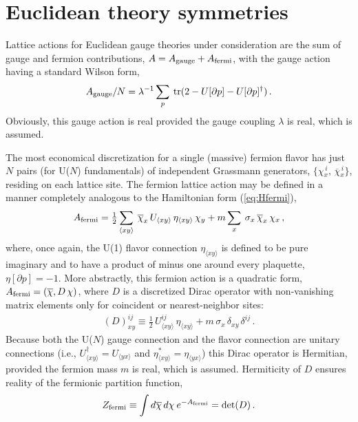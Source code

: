 \documentclass [12pt]{article}
\newcommand{\tr}{\mathop{\mathrm{tr}}}
\begin{document}
\section {Euclidean theory symmetries}\label{sec:Euclidean}

Lattice actions for
Euclidean gauge theories under consideration 
are the sum of gauge and fermion contributions,
$A = A_{\rm gauge} + A_{\rm fermi}$, with the gauge action
having a standard Wilson form,
\begin{align}
    A_{\rm gauge}/N
    =
    \lambda^{-1} \sum_p \> \tr (2 - U[\partial p] - U[\partial p]^\dagger) \,.
\label{eq:Agauge}
\end{align}
Obviously, this gauge action is real provided the gauge coupling $\lambda$ is
real, which is assumed.

The most economical discretization for a single (massive) fermion flavor 
has just $N$ pairs (for U($N$) fundamentals) 
of independent Grassmann generators,
$\{ \chi{}_x^{\,i},\, \overline\chi{}_x^{\,i}\}$,
residing on each lattice site.
The fermion lattice action may be defined in a manner
completely analogous to the Hamiltonian form (\ref{eq:Hfermi}),
\begin{align}
    A_{\rm fermi}
    =
    \tfrac 12 \sum_{\langle xy \rangle} \>
    \overline\chi_x \, U_{\langle xy \rangle} \, \eta_{\langle xy \rangle} \, \chi_y
    + m \sum_x \> \sigma_x \, \overline\chi_x \, \chi_x \,,
\label{eq:Afermiold}
\end{align}
where, once again, the U(1) flavor connection $\eta_{\langle xy\rangle}$ is defined
to be pure imaginary and to have a product of minus one around every plaquette,
$\eta[\partial p] = -1$.
More abstractly, this fermion action is a quadratic form,
$
    A_{\rm fermi} = (\overline\chi, D \,\chi)
$,
where $D$ is a discretized Dirac operator with non-vanishing matrix elements
only for coincident or nearest-neighbor sites:
\begin{align}
    (D)_{xy}^{ij} \equiv
    \tfrac 12 \, U_{\langle xy \rangle}^{ij} \, \eta_{\langle xy \rangle}
    + m \, \sigma_x \, \delta_{xy} \, \delta^{ij} \,.
\end{align}
Because both the U($N$) gauge connection and the flavor connection 
are unitary connections
(i.e., $U_{\langle xy \rangle}^\dagger = U_{\langle yx \rangle}$
and $\eta_{\langle xy \rangle}^* = \eta_{\langle yx \rangle}$)
this Dirac operator is Hermitian,
provided the fermion mass $m$ is real, which is assumed.
Hermiticity of $D$ ensures reality of the fermionic partition function,
\begin{align}
    Z_{\rm fermi} \equiv \int d\overline \chi \, d\chi \> e^{-A_{\rm fermi}}
    = \det (D) \,.
\end{align}
\end{document}
